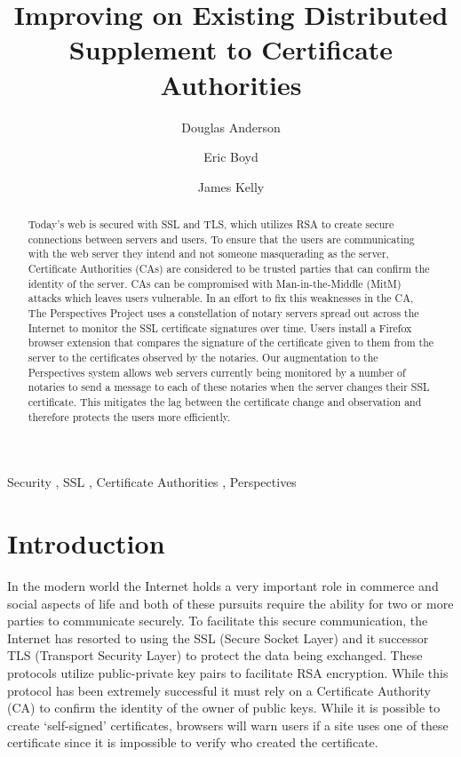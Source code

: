 \documentclass[preprint,review,12pt]{elsarticle}
\begin{document}
\begin{frontmatter}

\title{Improving on Existing Distributed Supplement to Certificate Authorities}

\author[doug]{Douglas Anderson}
\author[eric]{Eric Boyd}
\author[james]{James Kelly}
\address[doug]{dander01@uoguelph.ca}
\address[eric]{boyde@uoguelph.ca}
\address[james]{kellyj@uoguelph.ca}


\begin{abstract}

Today's web is secured with SSL and TLS, which utilizes RSA to create secure
connections between servers and users. To ensure that the users are
communicating with the web server they intend and not someone masquerading as
the server, Certificate Authorities (CAs) are considered to be trusted parties
that can confirm the identity of the server. CAs can be compromised with
Man-in-the-Middle (MitM) attacks which leaves users vulnerable. In an effort to
fix this weaknesses in the CA, The Perspectives Project uses a constellation of
notary servers spread out across the Internet to monitor the SSL certificate
signatures over time. Users install a Firefox browser extension that compares
the signature of the certificate given to them from the server to the
certificates observed by the notaries. Our augmentation to the Perspectives
system allows web servers currently being monitored by a number of notaries to
send a message to each of these notaries when the server changes their SSL
certificate. This mitigates the lag between the certificate change and
observation and therefore protects the users more efficiently.

\end{abstract}

\begin{keyword}
Security \sep
SSL \sep
Certificate Authorities \sep
Perspectives
\end{keyword}

\end{frontmatter}

\section{Introduction}
\label{intro}

In the modern world the Internet holds a very important role in commerce and
social aspects of life and both of these pursuits require the ability for two
or more parties to communicate securely. To facilitate this secure
communication, the Internet has resorted to using the SSL (Secure Socket Layer)
and it successor TLS (Transport Security Layer) to protect the data being
exchanged.  These protocols utilize public-private key pairs to facilitate RSA
encryption.  While this protocol has been extremely successful it must rely on
a Certificate Authority (CA) to confirm the identity of the owner of public
keys. While it is possible to create `self-signed' certificates, browsers will
warn users if a site uses one of these certificate since it is impossible to
verify who created the certificate.
\end{document}
